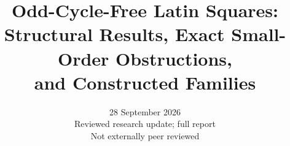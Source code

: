 \documentclass[11pt]{article}
\title{Odd-Cycle-Free Latin Squares:\\
Structural Results, Exact Small-Order Obstructions,\\
and Constructed Families}
\author{}
\date{28 September 2026\\\small Reviewed research update; full report\\Not externally peer reviewed}
\begin{document}
\maketitle


\tableofcontents






















\footnotesize


\end{document}
